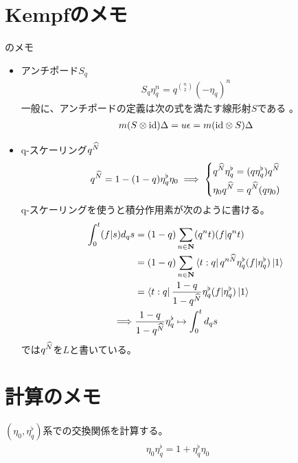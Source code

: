 {\setlength\arraycolsep{2pt}
%
\section{Kempfのメモ}\label{s1:Kempfのメモ} %
	\cite{kempf:1994}のメモ
	\begin{itemize}\setlength{\itemsep}{-1mm} %
		\item アンチポード$S_q$
		\begin{equation*}\begin{split}
			S_q\eta_q^n = q^{\binom{n}{2}}(-\eta_q)^n
		\end{split}\end{equation*}
		一般に、アンチポードの定義は次の式を満たす線形射$S$である
		\cite{bk:jinbo.ryousigun}。
		\begin{equation*}\begin{split}
			m(S\otimes{\ensuremath{\operatorname{id}}})\Delta = u\epsilon = m({\operatorname{id}}\otimes S)\Delta
		\end{split}\end{equation*}
		\item q-スケーリング$q^{\widehat{N}}$
		\begin{equation*}\begin{split}
			q^{\widehat{N}} = 1 - (1 - q)\eta_q^\flat\eta_0
			\implies \left\{\begin{split}
				q^{\widehat{N}}\eta_q^\flat &= (q\eta_q^\flat)q^{\widehat{N}} \\
				\eta_0q^{\widehat{N}} &= q^{\widehat{N}}(q\eta_0) \\
			\end{split}\right.
		\end{split}\end{equation*}
		q-スケーリングを使うと積分作用素が次のように書ける。
		\begin{equation*}\begin{split}
			\int_0^t(f|s)d_qs &= (1-q)\sum_{n\in\mathbf{N}} (q^nt)(f|q^nt) \\
			&= (1-q)\sum_{n\in\mathbf{N}}\mathinner{\langle{t:q}|}q^{n{\widehat{N}}}
				\eta_q^\flat(f|\eta_q^\flat)\mathinner{|{1}\rangle} \\
			&= \mathinner{\langle{t:q}|}\frac{1-q}{1-q^{\widehat{N}}}\eta_q^\flat(f|\eta_q^\flat)\mathinner{|{1}\rangle} \\
			\implies & \frac{1-q}{1-q^{\widehat{N}}}\eta_q^\flat\mapsto \int_0^td_qs
		\end{split}\end{equation*}
		\cite{kempf:1994}では$q^{\widehat{N}}$を$L$と書いている。
	\end{itemize} %
\section{計算のメモ}\label{s1:計算のメモ} %
	$(\eta_0,\eta_q^\flat)$系での交換関係を計算する。
	\begin{equation*}\begin{split}
		\eta_0\eta_q^\flat = 1 + \eta_q^\flat\eta_0
	\end{split}\end{equation*}
}

